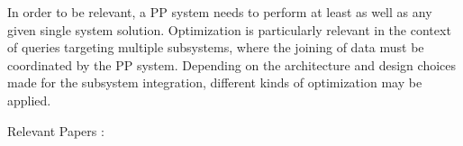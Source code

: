In order to be relevant, a PP system needs to perform at least as well as any given single system solution. Optimization is particularly relevant in the context of queries targeting multiple subsystems, where the joining of data must be coordinated by the PP system. Depending on the architecture and design choices made for the subsystem integration, different kinds of optimization may be applied.

Relevant Papers : ~\cite{bugiotti2015} ~\cite{LeFevre2014}  ~\cite{Haas1997} ~\cite{Srivastava2006} ~\cite{Halevy2001}
 ~\cite{Botan2009} ~\cite{Botan2010} ~\cite{Lim2013} ~\cite{Cure2011} ~\cite{Papakonstantinou1998}  ~\cite{Ives2002}  ~\cite{Borkar2006}
  ~\cite{Liu2010}

 